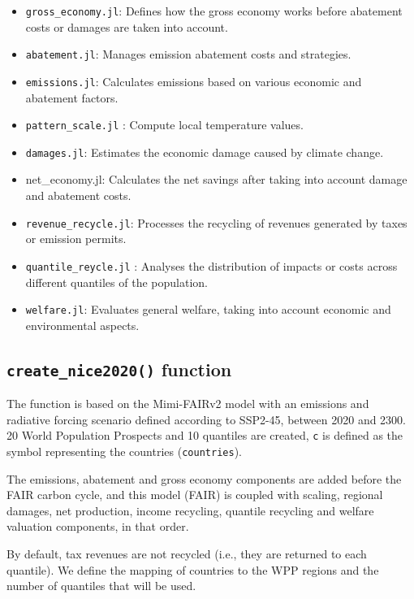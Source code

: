 \documentclass[
]{article}
\begin{document}
\begin{itemize}
\item
  \texttt{gross\_economy.jl}: Defines how the gross economy works before
  abatement costs or damages are taken into account.
\item
  \texttt{abatement.jl}: Manages emission abatement costs and
  strategies.
\item
  \texttt{emissions.jl}: Calculates emissions based on various economic
  and abatement factors.
\item
  \texttt{pattern\_scale.jl} : Compute local temperature values.
\item
  \texttt{damages.jl}: Estimates the economic damage caused by climate
  change.
\item
  net\_economy.jl: Calculates the net savings after taking into account
  damage and abatement costs.
\item
  \texttt{revenue\_recycle.jl}: Processes the recycling of revenues
  generated by taxes or emission permits.
\item
  \texttt{quantile\_reycle.jl} : Analyses the distribution of
  impacts or costs across different quantiles of the population.
\item
  \texttt{welfare.jl}: Evaluates general welfare, taking into account
  economic and environmental aspects.
\end{itemize}

\subsection{\texorpdfstring{\texttt{create\_nice2020()}
function}{create\_nice2020() function}}\label{create_nice_v2-function}

The function is based on the Mimi-FAIRv2 model with an emissions and
radiative forcing scenario defined according to SSP2-45, between 2020
and 2300. 20 World Population Prospects
and 10 quantiles are created, \texttt{c} is defined as the symbol
representing the countries (\texttt{countries}).

The emissions, abatement and gross economy components are added before
the FAIR carbon cycle, and this model (FAIR) is coupled with scaling,
regional damages, net production, income recycling, quantile recycling
and welfare valuation components, in that order.

By default, tax revenues are not recycled (i.e., they are returned to each quantile). We define the mapping of countries to the WPP regions and the number of quantiles that will be used.
\end{document}

